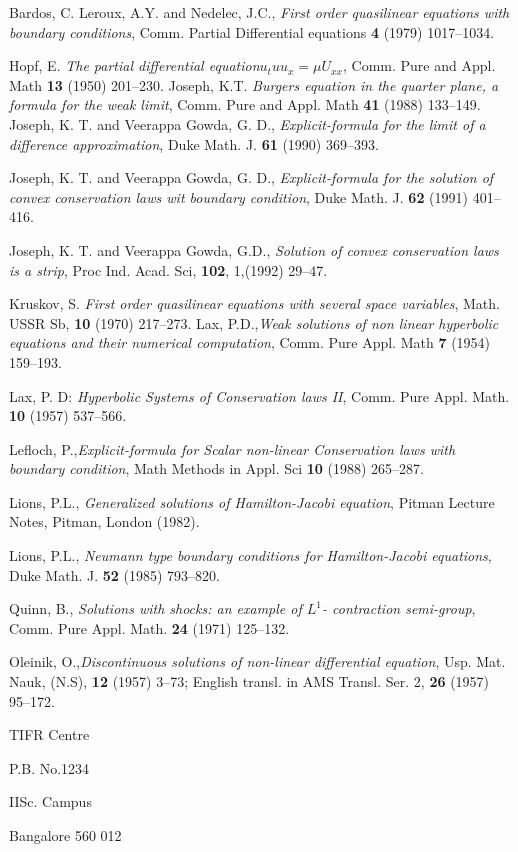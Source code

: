\begin{thebibliography}{99}
 Bardos, C. Leroux, A.Y. and Nedelec, J.C., \textit{First order quasilinear equations with boundary conditions}, Comm. Partial Differential equations {\bf 4} (1979) 1017--1034.

 Hopf, E. \textit{The partial differential equation}$ u_{t}uu_{x}=\mu U_{xx}$, Comm. Pure and Appl. Math {\bf 13} (1950) 201--230.
 Joseph, K.T. \textit{Burgers equation in the quarter plane, a formula for the weak limit}, Comm. Pure and Appl. Math {\bf 41} (1988) 133--149.
 Joseph, K. T. and Veerappa Gowda, G. D., \textit{Explicit-formula for the limit of a difference approximation}, Duke Math. J. {\bf 61} (1990) 369--393.

 Joseph, K. T. and Veerappa Gowda, G. D., \textit{Explicit-formula for the solution of convex conservation laws wit boundary condition}, Duke Math. J. {\bf 62} (1991) 401--416.

 Joseph, K. T. and Veerappa Gowda, G.D., \textit{Solution of convex conservation laws is a strip}, Proc Ind. Acad. Sci, {\bf 102}, 1,(1992) 29--47.

 Kruskov, S. \textit{First order quasilinear equations with several space variables}, Math. USSR Sb,
 {\bf 10} (1970) 217--273.
 Lax, P.D.,\pageoriginale \textit{Weak solutions of non linear hyperbolic equations and their numerical computation}, Comm. Pure Appl. Math {\bf 7} (1954) 159--193.

 Lax, P. D: \textit{Hyperbolic Systems of Conservation laws II}, Comm. Pure Appl. Math. {\bf 10} (1957) 537--566.
 
 Lefloch, P.,\textit{Explicit-formula for Scalar non-linear Conservation laws with boundary condition}, Math Methods in Appl. Sci {\bf 10} (1988) 265--287.

 Lions, P.L., \textit{Generalized solutions of Hamilton-Jacobi equation}, Pitman Lecture Notes, Pitman, London (1982).

 Lions, P.L., \textit{Neumann type boundary conditions for Hamilton-Jacobi equations}, Duke Math. J.
{\bf 52} (1985) 793--820.

 Quinn, B., \textit{Solutions with shocks: an example of $L^{1}$- contraction semi-group}, Comm. Pure Appl. Math. {\bf 24} (1971) 125--132.

 Oleinik, O.,\textit{Discontinuous solutions of non-linear differential equation}, Usp. Mat. Nauk, (N.S), {\bf 12} (1957) 3--73; English transl. in AMS Transl. Ser. 2, {\bf 26} (1957) 95--172.
\end{thebibliography}

\bigskip

\begin{flushleft}
TIFR Centre

P.B. No.1234

IISc. Campus

Bangalore 560 012
\end{flushleft}
